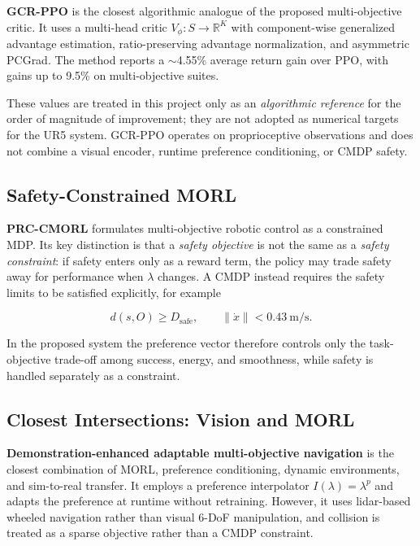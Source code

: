 \documentclass[11pt,a4paper]{article}
\begin{document}
\textbf{GCR-PPO} \cite{munn2025} is the closest algorithmic analogue of
the proposed multi-objective critic. It uses a multi-head critic
$V_{\phi}:S\rightarrow\mathbb{R}^{K}$ with component-wise generalized
advantage estimation, ratio-preserving advantage normalization, and
asymmetric PCGrad. The method reports a $\sim$4.55\% average return gain
over PPO, with gains up to 9.5\% on multi-objective suites.

These values are treated in this project only as an \emph{algorithmic
reference} for the order of magnitude of improvement; they are not adopted
as numerical targets for the UR5 system. GCR-PPO operates on
proprioceptive observations and does not combine a visual encoder,
runtime preference conditioning, or CMDP safety.

\subsection{Safety-Constrained MORL}

\textbf{PRC-CMORL} \cite{he2023} formulates multi-objective robotic
control as a constrained MDP. Its key distinction is that a
\emph{safety objective} is not the same as a \emph{safety constraint}:
if safety enters only as a reward term, the policy may trade safety away
for performance when $\lambda$ changes. A CMDP instead requires the
safety limits to be satisfied explicitly, for example

\begin{equation}
d(s,O)\geq D_{\mathrm{safe}},\qquad
\|\dot{x}\|<0.43~\mathrm{m/s}.
\end{equation}

In the proposed system the preference vector therefore controls only the
task-objective trade-off among success, energy, and smoothness, while
safety is handled separately as a constraint.

\subsection{Closest Intersections: Vision and MORL}

\textbf{Demonstration-enhanced adaptable multi-objective navigation}
\cite{deheuvel2025} is the closest combination of MORL, preference
conditioning, dynamic environments, and sim-to-real transfer. It employs a
preference interpolator $I(\lambda)=\lambda^{p}$ and adapts the
preference at runtime without retraining. However, it uses lidar-based
wheeled navigation rather than visual 6-DoF manipulation, and collision is
treated as a sparse objective rather than a CMDP constraint.
\end{document}
